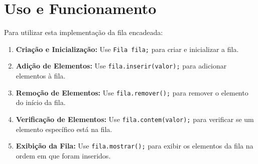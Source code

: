 \documentclass[a4paper,12pt]{article}
\begin{document}
\section{Uso e Funcionamento}
Para utilizar esta implementação da fila encadeada:
\begin{enumerate}
    \item \textbf{Criação e Inicialização:} Use \texttt{Fila fila;} para criar e inicializar a fila.
    \item \textbf{Adição de Elementos:} Use \texttt{fila.inserir(valor);} para adicionar elementos à fila.
    \item \textbf{Remoção de Elementos:} Use \texttt{fila.remover();} para remover o elemento do início da fila.
    \item \textbf{Verificação de Elementos:} Use \texttt{fila.contem(valor);} para verificar se um elemento específico está na fila.
    \item \textbf{Exibição da Fila:} Use \texttt{fila.mostrar();} para exibir os elementos da fila na ordem em que foram inseridos.
\end{enumerate}
\end{document}
